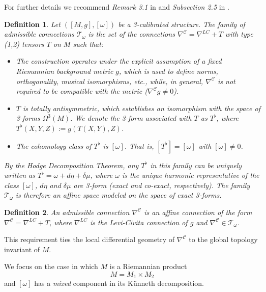 \documentclass[12pt]{article}
\newtheorem{definition}{Definition}[section]
\begin{document}
\noindent For further details we recommend \emph{Remark 3.1} in \cite{Pigazzini}  and \emph{Subsection 2.5} in \cite{Pigazzini-Toda}. 

\begin{definition} Let $([M, g], [\omega])$ be a 3-calibrated structure. The \emph{family of admissible connections} $\mathcal{T}_\omega$ is the set of the connections $\nabla^{\mathcal{C}}=\nabla^{LC}+T$ with type (1,2) tensors $T$ on $M$ such that:
\begin{itemize}
\item The construction operates under the explicit assumption of a fixed Riemannian background metric  $g$, which is used to define norms, orthogonality, musical isomorphisms, etc., while, in general, $\nabla^{\mathcal{C}}$ is not required to be compatible with the metric ($\nabla^{\mathcal{C}} g \neq 0$).
\item $T$ is totally antisymmetric, which establishes an isomorphism with the space of 3-forms $\Omega^3(M)$. We denote the 3-form associated with $T$ as $T^\flat$, where $T^\flat(X,Y,Z) := g(T(X,Y),Z)$.
\item The cohomology class of $T^\flat$ is $[\omega]$. That is, $[T^\flat] = [\omega]$ with $[\omega] \neq 0$.
\end{itemize}

\noindent By the Hodge Decomposition Theorem, any $T^\flat$ in this family can be uniquely written as $T^\flat = \omega + d\eta +\delta \mu$, where $\omega$ is the unique harmonic representative of the class $[\omega]$, $d\eta$ and $\delta \mu$ are 3-form (exact and co-exact, respectively). The family $\mathcal{T}_\omega$ is therefore an affine space modeled on the space of exact 3-forms.
\end{definition}

\begin{definition} An admissible connection $\nabla^{\mathcal{C}}$ is an affine connection of the form $\nabla^{\mathcal{C}}= \nabla^{LC} + T$, where $\nabla^{LC}$ is the Levi-Civita connection of $g$ and $\nabla^{\mathcal{C}} \in \mathcal{T}_\omega$.
\end{definition}

\noindent This requirement ties the local differential geometry of $\nabla^{\mathcal{C}}$ to the global topology invariant of $M$.  

We focus on the case in which $M$ is a Riemannian product
\[
M = M_1 \times M_2
\]
\noindent and $[\omega]$ has a \emph{mixed} component in its K\"unneth decomposition.
\end{document}
